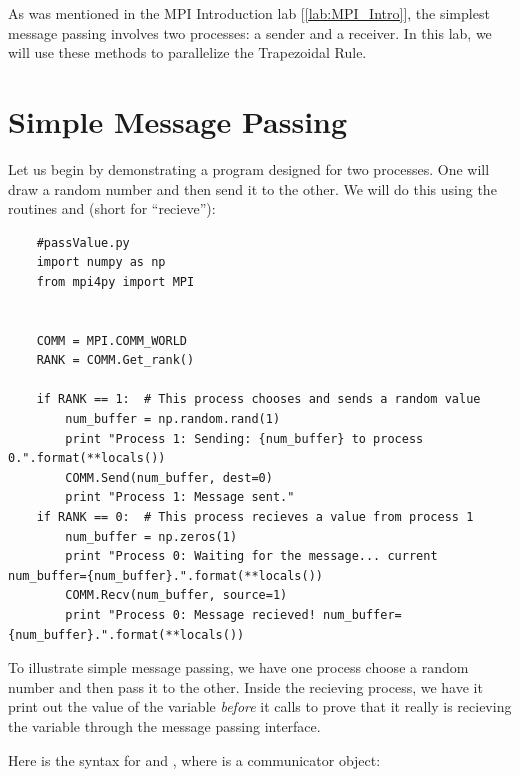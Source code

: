 \label{lab:MPI_Trapezoidal_Rule}

  As was mentioned in the MPI Introduction lab [\ref{lab:MPI_Intro}], the simplest message passing involves two processes: a sender and a receiver. In this lab, we will use these methods to parallelize the Trapezoidal Rule.

\section*{Simple Message Passing}
  Let us begin by demonstrating a program designed for two processes. One will draw a random number and then send it to the other. We will do this using the routines  and  (short for ``recieve''):

  \begin{lstlisting}
    #passValue.py
    import numpy as np
    from mpi4py import MPI


    COMM = MPI.COMM_WORLD
    RANK = COMM.Get_rank()

    if RANK == 1:  # This process chooses and sends a random value
        num_buffer = np.random.rand(1)
        print "Process 1: Sending: {num_buffer} to process 0.".format(**locals())
        COMM.Send(num_buffer, dest=0)
        print "Process 1: Message sent."
    if RANK == 0:  # This process recieves a value from process 1
        num_buffer = np.zeros(1)
        print "Process 0: Waiting for the message... current num_buffer={num_buffer}.".format(**locals())
        COMM.Recv(num_buffer, source=1)
        print "Process 0: Message recieved! num_buffer={num_buffer}.".format(**locals())
  \end{lstlisting}


  To illustrate simple message passing, we have one process choose a random number and then pass it to the other. Inside the recieving process, we have it print out the value of the variable  \emph{before} it calls  to prove that it really is recieving the variable through the message passing interface.

  Here is the syntax for  and , where  is a communicator object:

